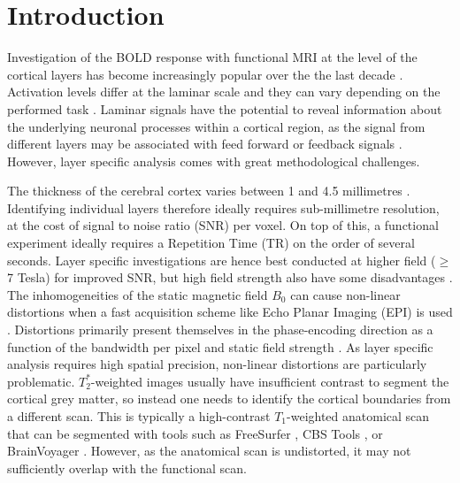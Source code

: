 \section*{Introduction}
Investigation of the BOLD response with functional MRI at the level of the cortical layers has become increasingly popular over the the last decade \citep{Dumoulin2017,Trampel2017}. Activation levels differ at the laminar scale \citep{Koopmans2011} and they can vary depending on the performed task \citep{Muckli2015,Kok2016}. Laminar signals have the potential to reveal information about the underlying neuronal processes within a cortical region, as the signal from different layers may be associated with feed forward or feedback signals \citep{Felleman1991,Self2017}. However, layer specific analysis comes with great methodological challenges.

The thickness of the cerebral cortex varies between 1 and 4.5 millimetres \citep{Zilles1990,Fischl2000}. Identifying individual layers therefore ideally requires sub-millimetre resolution, at the cost of signal to noise ratio (SNR) per voxel. On top of this, a functional experiment ideally requires a Repetition Time (TR) on the order of several seconds. Layer specific investigations are hence best conducted at higher field ($\ge$7 Tesla) for improved SNR, but high field strength also have some disadvantages \citep{Poser2017}. The inhomogeneities of the static magnetic field $B_0$ can cause non-linear distortions when a fast acquisition scheme like Echo Planar Imaging (EPI) is used \citep{Mansfield1977}. Distortions primarily present themselves in the phase-encoding direction as a function of the bandwidth per pixel and static field strength \citep{Schmitt1998}. As layer specific analysis requires high spatial precision, non-linear distortions are particularly problematic. $T_2^*$-weighted images usually have insufficient contrast to segment the cortical grey matter, so instead one needs to identify the cortical boundaries from a different scan. This is typically a high-contrast $T_1$-weighted anatomical scan that can be segmented with tools such as FreeSurfer \citep{Dale1999}, CBS Tools \citep{Bazin2014}, or BrainVoyager \citep{Goebel2012}. However, as the anatomical scan is undistorted, it may not sufficiently overlap with the functional scan. 

